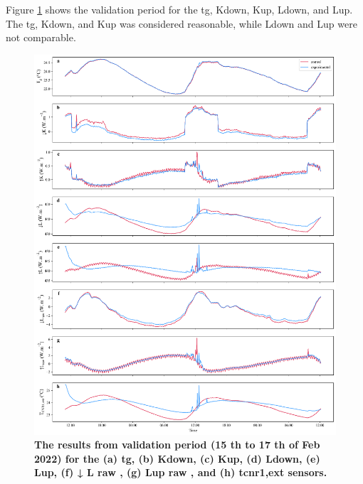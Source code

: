 \documentclass[final,3p,times,authoryear]{elsarticle}
\begin{document}
Figure \ref{fig:7.5} shows the validation period for the \gls{tg}, \gls{Kdown}, \gls{Kup}, \gls{Ldown}, and \gls{Lup}. The \gls{tg}, \gls{Kdown}, and
\gls{Kup} was considered reasonable, while \gls{Ldown} and \gls{Lup} were not comparable.

\begin{figure}
\centering
\includegraphics[trim={0 0 0 0},clip,scale=1.0]{pict020.png}
\caption{\bf The results from validation period (15 th to 17 th of Feb 2022) for the (a) \gls{tg}, (b) \gls{Kdown}, (c) \gls{Kup}, (d)
\gls{Ldown}, (e) \gls{Lup}, (f) ↓ L raw , (g) \gls{Lup} raw , and (h) \gls{tcnr1},ext sensors.}
 \label{fig:7.5}
\end{figure}
\end{document}
